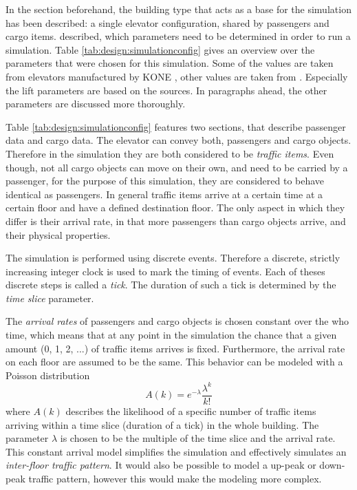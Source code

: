 In the section beforehand, the building type that acts as a base for the simulation has been described:
a single elevator configuration, shared by passengers and cargo items.
\textcite[][p.~347]{barney2016handbook} described, which parameters need to be determined in order to run a simulation. 
Table \ref{tab:design:simulationconfig} gives an overview over the parameters that were chosen for this simulation.
Some of the values are taken from elevators manufactured by KONE \autocite[][]{kone2017overview}, 
other values are taken from \textcite[][p.~349]{barney2016handbook}.
Especially the lift parameters are based on the sources.
In paragraphs ahead, the other parameters are discussed more thoroughly.

Table \ref{tab:design:simulationconfig} features two sections, that describe passenger data and cargo data.
The elevator can convey both, passengers and cargo objects.
Therefore in the simulation they are both considered to be \emph{traffic items}.
Even though, not all cargo objects can move on their own, and need to be carried by a passenger,
for the purpose of this simulation, they are considered to behave identical as passengers.
In general traffic items arrive at a certain time at a certain floor and have a defined destination floor.
The only aspect in which they differ is their arrival rate, in that more passengers than cargo objects arrive, and their physical properties.

The simulation is performed using discrete events.
Therefore a discrete, strictly increasing integer clock is used to mark the timing of events.
Each of theses discrete steps is called a \emph{tick}.
The duration of such a tick is determined by the \emph{time slice} parameter.

The \emph{arrival rates} of passengers and cargo objects is chosen constant over the who time, 
which means that at any point in the simulation the chance that a given amount (0, 1, 2, ...) of traffic items arrives is fixed.
Furthermore, the arrival rate on each floor are assumed to be the same.
This behavior can be modeled with a Poisson distribution
$$ A(k) = e^{-\lambda}\frac{\lambda^k}{k!} $$
where $ A(k) $ describes the likelihood of a specific number of traffic items arriving within a time slice (duration of a tick) in the whole building.
The parameter $ \lambda $ is chosen to be the multiple of the time slice and the arrival rate.
This constant arrival model simplifies the simulation and effectively simulates an \emph{inter-floor traffic pattern}.
It would also be possible to model a up-peak or down-peak traffic pattern, however this would make the modeling more complex.

